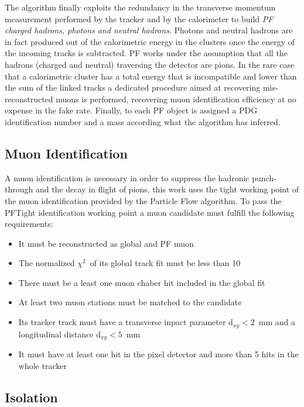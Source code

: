 The algorithm finally exploits the redundancy in the transverse momentum measurement performed by the tracker and by the calorimeter to build \emph{PF charged hadrons, photons and neutral hadrons}. Photons and neutral hadrons are in fact produced out of the calorimetric energy in the clusters once the energy of the incoming tracks is subtracted. PF works under the assumption that all the hadrons (charged and neutral) traversing the detector are pions. In the rare case that a calorimetric cluster has a total energy that is incompatible and lower than the sum of the linked tracks a dedicated procedure aimed at recovering mis-reconstructed muons is performed, recovering muon identification efficiency at no expense in the fake rate. Finally, to each PF object is assigned a PDG identification number and a mass according what the algorithm has inferred.

\subsection{Muon Identification}

A muon identification is necessary in order to suppress the hadronic punch-through and the decay in flight of pions, this work uses the tight working point of the muon identification provided by the Particle Flow algorithm.
To pass the PFTight identification working point a muon candidate must fulfill the following requirements:

\begin{itemize}
\item It must be reconstructed as global and PF muon
\item The normalized $\chi^2$\ of its global track fit must be less than 10
\item There must be a least one muon chaber hit included in the global fit
\item At least two muon stations must be matched to the candidate
\item Its tracker track must have a transverse inpact parameter $\mathrm{d}_{xy} < 2$\ mm and a longitudinal distance $\mathrm{d}_{xy} < 5$\ mm
\item It must have at least one hit in the pixel detector and more than 5 hits in the whole tracker
\end{itemize}

\subsection{Isolation}

